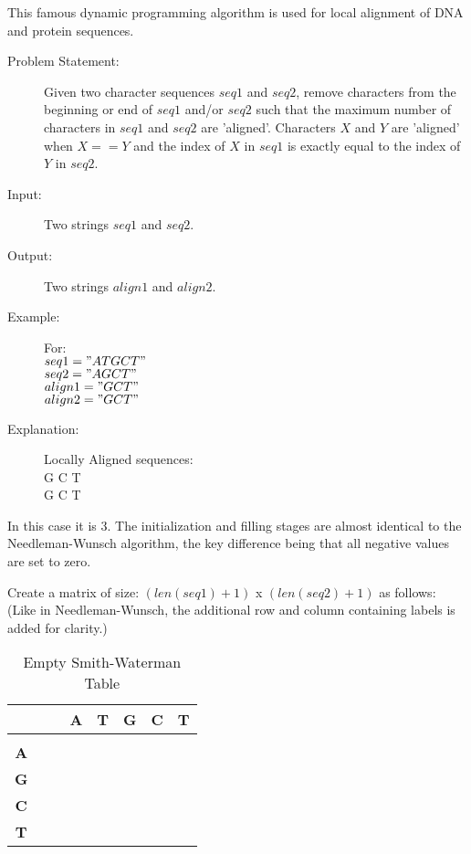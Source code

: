 This famous dynamic programming algorithm is used for local alignment of DNA and protein sequences.

\begin{description}
    
    \item[Problem Statement:]
        Given two character sequences $seq1$ and $seq2$,
        remove characters from the beginning or end of $seq1$ and/or $seq2$ such that the maximum number of characters in $seq1$ and $seq2$ are 'aligned'.
        Characters $X$ and $Y$ are 'aligned' when $X == Y$ and the index of $X$ in $seq1$ is exactly equal to the index of $Y$ in $seq2$.
        
    \item[Input:] 
        Two strings $seq1$ and $seq2$.
        
    \item[Output:]
        Two strings $align1$ and $align2$.
        
    \item[Example:] For:\\
        $seq1 = "ATGCT"$\\
        $seq2 = "AGCT"$\\
        $align1 = "GCT"$\\
        $align2 = "GCT"$

    \item[Explanation:]
        Locally Aligned sequences:\\
        G C T\\
        G C T
\end{description}
In this case it is 3.
The initialization and filling stages are almost identical to the Needleman-Wunsch algorithm, the key difference being that all negative values are set to zero.

Create a matrix of size: $(len(seq1) + 1)$ x $(len(seq2) + 1)$ as follows:
(Like in Needleman-Wunsch, the additional row and column containing labels is added for clarity.)

\begin{table}[H]
    \centering
    \begin{tabular}{|c|c|c|c|c|c|c|}
        \hline
          & $\phantom{\textbf{A}}$ & \textbf{A} & \textbf{T} & \textbf{G} & \textbf{C} & \textbf{T} \\
        \hline
         &  &  &  &  &  &  \\
        \hline
        \textbf{A} &  &  &  &  &  &  \\
        \hline
        \textbf{G} &  &  &  &  &  &  \\
        \hline
        \textbf{C} &  &  &  &  &  &  \\
        \hline
        \textbf{T} &  &  &  &  &  &  \\
        \hline
    \end{tabular}
    \caption{Empty Smith-Waterman Table}
\end{table}


